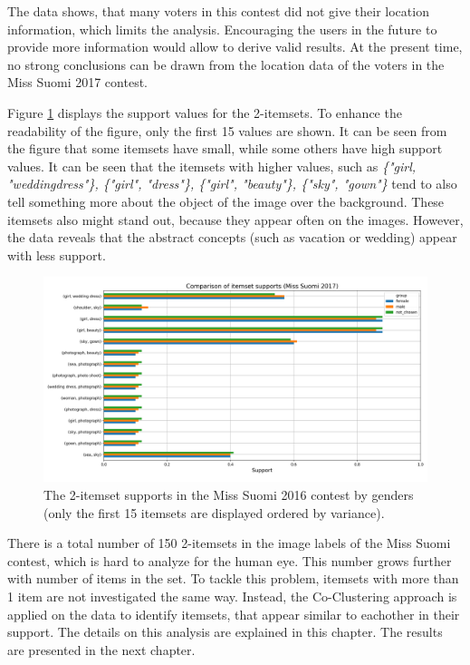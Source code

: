 The data shows, that many voters in this contest did not give their location information, which limits the analysis. Encouraging the users in the future to provide more information would allow to derive valid results. At the present time, no strong conclusions can be drawn from the location data of the voters in the Miss Suomi 2017 contest. 

Figure \ref{itemset_supports-gender-Miss_Helsinki-2_itemset} displays the support values for the 2-itemsets. To enhance the readability of the figure, only the first 15 values are shown. It can be seen from the figure that some itemsets have small, while some others have high support values. It can be seen that the itemsets with higher values, such as \textit{\{"girl, "wedding\:dress"\}, \{"girl", "dress"\}, \{"girl", "beauty"\}, \{"sky", "gown"\}} tend to also tell something more about the object of the image over the background. These itemsets also might stand out, because they appear often on the images. However, the data reveals that the abstract concepts (such as vacation or wedding) appear with less support. 

\begin{figure}[h] 
    \begin{center}
        \includegraphics[width=1.0\textwidth]{Images/itemset_supports-gender-Miss_Helsinki-2_itemset.png}
        \caption{The 2-itemset supports in the Miss Suomi 2016 contest by genders (only the first 15 itemsets are displayed ordered by variance).}
        \label{itemset_supports-gender-Miss_Helsinki-2_itemset}
    \end{center}
\end{figure}

There is a total number of 150 2-itemsets in the image labels of the Miss Suomi contest, which is hard to analyze for the human eye. This number grows further with number of items in the set. To tackle this problem, itemsets with more than 1 item are not investigated the same way. Instead, the Co-Clustering approach is applied on the data to identify itemsets, that appear similar to eachother in their support. The details on this analysis are explained in this chapter. The results are presented in the next chapter.

